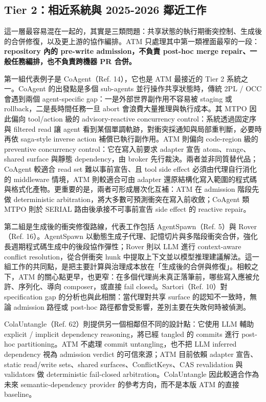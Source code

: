 \documentclass[a4paper,fontset=none]{ctexart}
\begin{document}
\subsection{Tier 2：相近系統與 2025-2026 鄰近工作}

這一層最容易混在一起的，其實是三類問題：共享狀態的執行期衝突控制、生成後的合併修復，以及更上游的協作編排。ATM 只處理其中第一類裡面最窄的一段：\textbf{repository 內的 pre-write admission，不負責 post-hoc merge repair、一般任務編排，也不負責跨機器 PR 合併。}

第一組代表例子是 CoAgent（Ref. 14），它也是 ATM 最接近的 Tier 2 系統之一。CoAgent 的出發點是多個 sub-agents 並行操作共享狀態時，傳統 2PL / OCC 會遇到兩個 agent-specific gap：一是外部世界副作用不容易被 staging 或 rollback，二是長時間任務一旦 abort 會浪費大量推理與執行成本。其 MTPO 因此偏向 tool/action 級的 advisory-reactive concurrency control：系統透過固定序與 filtered read 讓 agent 看到某個單調軌跡，對衝突採通知與局部重判斷，必要時再依 saga-style inverse action 補償已執行副作用。ATM 則偏向 code-region 級的 preventive concurrency control：它在寫入前要求 adapter 宣告 atom、range、shared surface 與靜態 dependency，由 broker 先行裁決。兩者並非同質替代品；CoAgent 較適合 read set 難以事前宣告、且 tool side effect 必須由代理自行消化的 middleware 情境，ATM 則較適合可由 adapter 還原結構化寫入範圍的程式碼與格式化產物。更重要的是，兩者可形成層次化互補：ATM 在 admission 階段先做 deterministic arbitration，將大多數可預測衝突在寫入前收斂；CoAgent 類 MTPO 則於 SERIAL 路由後承接不可事前宣告 side effect 的 reactive repair。

第二組是生成後的衝突修復路線，代表工作包括 AgentSpawn（Ref. 5）與 Rover（Ref. 16）。AgentSpawn 以動態生成子代理、記憶切片與多階段衝突合併，強化長週期程式碼生成中的後段協作彈性；Rover 則以 LLM 進行 context-aware conflict resolution，從合併衝突 hunk 中提取上下文並以模型推理建議解法。這一組工作的共同點，是把主要計算與治理成本放在「生成後的合併與修復」。相較之下，ATM 的關心點更早，也更窄：在多個代理尚未真正落筆前，哪些寫入應被允許、序列化、導向 composer，或直接 fail closed。Sartori（Ref. 10）對 specification gap 的分析也與此相關：當代理對共享 surface 的認知不一致時，無論 admission 路徑或 post-hoc 路徑都會受影響，差別主要在失敗何時被偵測。

ColaUntangle（Ref. 62）則提供另一個相鄰但不同的設計點：它使用 LLM 輔助 explicit / implicit dependency reasoning，將已經 tangled 的 commits 進行 post-hoc partitioning。ATM 不處理 commit untangling，也不把 LLM inferred dependency 視為 admission verdict 的可信來源；ATM 目前依賴 adapter 宣告、static read/write sets、shared surfaces、ConflictKeys、CAS revalidation 與 validators 做 deterministic fail-closed arbitration。ColaUntangle 因此較適合作為未來 semantic-dependency provider 的參考方向，而不是本版 ATM 的直接 baseline。
\end{document}
